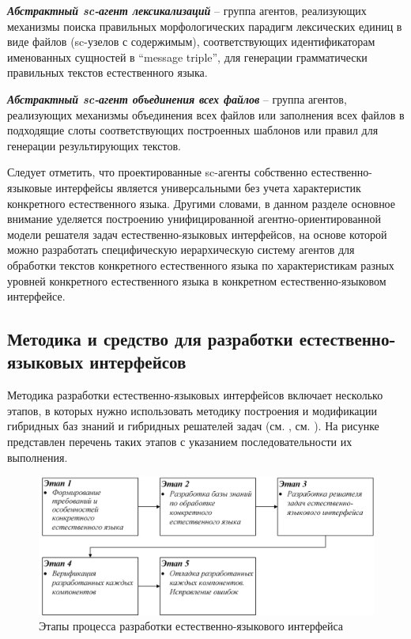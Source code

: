 \textit{\textbf{Абстрактный sc-агент лексикализаций}} -- группа агентов, реализующих механизмы поиска правильных морфологических парадигм лексических единиц в виде файлов (sc-узелов с содержимым), соответствующих идентификаторам именованных сущностей в ``message triple'', для генерации грамматически правильных текстов естественного языка.

\textit{\textbf{Абстрактный sc-агент объединения всех файлов}} -- группа агентов, реализующих механизмы объединения всех файлов или заполнения всех файлов в подходящие слоты соответствующих построенных шаблонов или правил для генерации результирующих текстов. 

Следует отметить, что проектированные sc-агенты собственно естественно-языковые интерфейсы является универсальными без учета характеристик конкретного естественного языка. Другими словами, в данном разделе основное внимание уделяется построению унифицированной агентно-ориентированной модели решателя задач естественно-языковых интерфейсов, на основе которой можно разработать специфическую иерархическую систему агентов для обработки текстов конкретного естественного языка по характеристикам разных уровней конкретного естественного языка в конкретном естественно-языковом интерфейсе.

\subsection{Методика и средство для разработки естественно-языковых интерфейсов}
Методика разработки естественно-языковых интерфейсов включает несколько этапов, в которых нужно использовать методику построения и модификации гибридных баз знаний и гибридных решателей задач (см. , см. ). На рисунке \textit{} представлен перечень таких этапов с указанием последовательности их выполнения.
\begin{figure}[H]
	\centering
	\includegraphics[scale=0.8,width=1.0\textwidth]{images/part4/chapter_chinese/method.png}
	\caption{Этапы процесса разработки естественно-языкового интерфейса}
	\label{fig:method-interface}
\end{figure}

